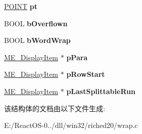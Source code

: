 \begin{DoxyCompactItemize}
\mbox{\label{structtag_m_e___wrap_context_abd1f06d40e4dce260cff752135526c6b}} 
\hyperlink{structtag_p_o_i_n_t}{P\+O\+I\+NT} {\bfseries pt}
\item 
\mbox{\label{structtag_m_e___wrap_context_ac7749e74f677821aa2362bb5541a8f6d}} 
B\+O\+OL {\bfseries b\+Overflown}
\item 
\mbox{\label{structtag_m_e___wrap_context_ada5e4251727580dc9ccaf29e1f3ac5be}} 
B\+O\+OL {\bfseries b\+Word\+Wrap}
\item 
\mbox{\label{structtag_m_e___wrap_context_a2c54a68fdc8ee7ec0f7e88d6ac917f3b}} 
\hyperlink{structtag_m_e___display_item}{M\+E\+\_\+\+Display\+Item} $\ast$ {\bfseries p\+Para}
\item 
\mbox{\label{structtag_m_e___wrap_context_a2b8908593f93de4f4913908d9b45d7c2}} 
\hyperlink{structtag_m_e___display_item}{M\+E\+\_\+\+Display\+Item} $\ast$ {\bfseries p\+Row\+Start}
\item 
\mbox{\label{structtag_m_e___wrap_context_a109f68fddb9f9eac174af898ac09055d}} 
\hyperlink{structtag_m_e___display_item}{M\+E\+\_\+\+Display\+Item} $\ast$ {\bfseries p\+Last\+Splittable\+Run}
\end{DoxyCompactItemize}


该结构体的文档由以下文件生成\+:\begin{DoxyCompactItemize}
\item 
E\+:/\+React\+O\+S-\/0../dll/win32/riched20/wrap.\+c\end{DoxyCompactItemize}
